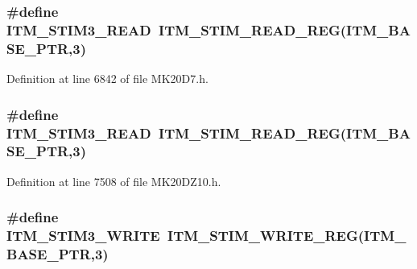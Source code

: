 \subsubsection[{\texorpdfstring{I\+T\+M\+\_\+\+S\+T\+I\+M3\+\_\+\+R\+E\+AD}{ITM_STIM3_READ}}]{\setlength{\rightskip}{0pt plus 5cm}\#define I\+T\+M\+\_\+\+S\+T\+I\+M3\+\_\+\+R\+E\+AD~{\bf I\+T\+M\+\_\+\+S\+T\+I\+M\+\_\+\+R\+E\+A\+D\+\_\+\+R\+EG}({\bf I\+T\+M\+\_\+\+B\+A\+S\+E\+\_\+\+P\+TR},3)}\hypertarget{group___i_t_m___register___accessor___macros_gac2585aa635223db51bc5dfb64d5901f0}{}\label{group___i_t_m___register___accessor___macros_gac2585aa635223db51bc5dfb64d5901f0}


Definition at line 6842 of file M\+K20\+D7.\+h.

\subsubsection[{\texorpdfstring{I\+T\+M\+\_\+\+S\+T\+I\+M3\+\_\+\+R\+E\+AD}{ITM_STIM3_READ}}]{\setlength{\rightskip}{0pt plus 5cm}\#define I\+T\+M\+\_\+\+S\+T\+I\+M3\+\_\+\+R\+E\+AD~{\bf I\+T\+M\+\_\+\+S\+T\+I\+M\+\_\+\+R\+E\+A\+D\+\_\+\+R\+EG}({\bf I\+T\+M\+\_\+\+B\+A\+S\+E\+\_\+\+P\+TR},3)}\hypertarget{group___i_t_m___register___accessor___macros_gac2585aa635223db51bc5dfb64d5901f0}{}\label{group___i_t_m___register___accessor___macros_gac2585aa635223db51bc5dfb64d5901f0}


Definition at line 7508 of file M\+K20\+D\+Z10.\+h.

\subsubsection[{\texorpdfstring{I\+T\+M\+\_\+\+S\+T\+I\+M3\+\_\+\+W\+R\+I\+TE}{ITM_STIM3_WRITE}}]{\setlength{\rightskip}{0pt plus 5cm}\#define I\+T\+M\+\_\+\+S\+T\+I\+M3\+\_\+\+W\+R\+I\+TE~{\bf I\+T\+M\+\_\+\+S\+T\+I\+M\+\_\+\+W\+R\+I\+T\+E\+\_\+\+R\+EG}({\bf I\+T\+M\+\_\+\+B\+A\+S\+E\+\_\+\+P\+TR},3)}\hypertarget{group___i_t_m___register___accessor___macros_ga5dd9fe046bf774394e98b8aae32f09be}{}\label{group___i_t_m___register___accessor___macros_ga5dd9fe046bf774394e98b8aae32f09be}


